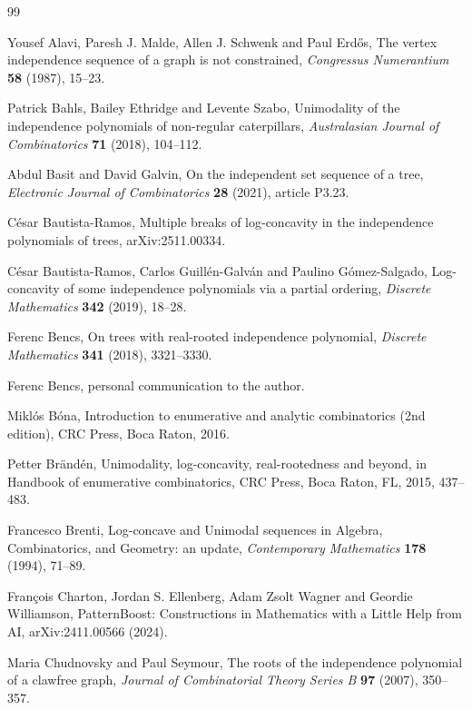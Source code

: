 \documentclass[12pt]{article}
\theoremstyle{definition}
\theoremstyle{definition}
\theoremstyle{definition}
\theoremstyle{definition}
\theoremstyle{definition}
\theoremstyle{definition}
\theoremstyle{definition}
\theoremstyle{definition}
\theoremstyle{remark}
\begin{document}
\begin{thebibliography}{99}

Yousef Alavi, Paresh J. Malde, Allen J. Schwenk and Paul Erd\H{o}s, The vertex independence sequence of a graph is not constrained, {\it Congressus Numerantium} {\bf 58} (1987), 15--23.

Patrick Bahls, Bailey Ethridge and Levente Szabo, Unimodality of the independence polynomials of non-regular caterpillars, {\it Australasian Journal of Combinatorics} {\bf 71} (2018), 104--112.

Abdul Basit and David Galvin, On the independent set sequence of a tree, {\it Electronic Journal of Combinatorics} {\bf 28} (2021), article P3.23.

C\'esar Bautista-Ramos, Multiple breaks of log-concavity in the independence polynomials of trees, arXiv:2511.00334.

C\'esar Bautista-Ramos, Carlos Guill\'en-Galv\'an and Paulino G\'omez-Salgado, Log-concavity of some independence polynomials via a partial ordering, {\it Discrete Mathematics} {\bf 342} (2019), 18--28.

Ferenc Bencs, On trees with real-rooted independence polynomial, {\it Discrete Mathematics} {\bf 341} (2018), 3321--3330.

Ferenc Bencs, personal communication to the author.

Mikl\'os B\'ona, Introduction to enumerative and analytic combinatorics (2nd edition), CRC Press, Boca Raton, 2016.

Petter Br\"and\'en, Unimodality, log-concavity, real-rootedness and beyond, in Handbook of enumerative combinatorics, CRC Press, Boca Raton, FL, 2015, 437--483.

Francesco Brenti, Log-concave and Unimodal sequences in Algebra, Combinatorics, and Geometry: an update, {\it Contemporary Mathematics} {\bf 178} (1994), 71--89.

Fran\c{c}ois Charton, Jordan S. Ellenberg, Adam Zsolt Wagner and Geordie Williamson, 
PatternBoost: Constructions in Mathematics with a Little Help from AI, arXiv:2411.00566 (2024). 

Maria Chudnovsky and Paul Seymour, The roots of the independence polynomial of a clawfree graph, {\it Journal of Combinatorial Theory Series B} {\bf 97} (2007), 350--357.


\end{thebibliography}
\end{document}
